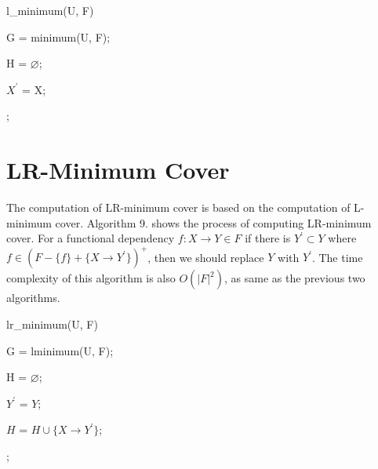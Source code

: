 \documentclass[11pt]{book}
\begin{document}
\begin{algorithm}
 
  \caption{l\_minimum(U, F)}
  
  \SetAlgoLined
  
  G = minimum(U, F);
  
  H = $\varnothing$;
  
   {
    $X^{'}$ = X;
     	
  }
  
  ;

\end{algorithm}

\section{LR-Minimum Cover}

The computation of LR-minimum cover is based on the computation of L-minimum cover. 
Algorithm 9. shows the process of computing LR-minimum cover. For a functional dependency $f: X \rightarrow Y \in F$ if there is $Y^{'} \subset Y$ where $f \in (F - \{f\} + \{ X \rightarrow Y^{'} \})^{+}$, then we should replace $Y$ with $Y^{'}$. The time complexity of this algorithm is also $O(|F|^2)$, as same as the previous two algorithms.

\begin{algorithm}

  \caption{lr\_minimum(U, F)}
  
  \SetAlgoLined
  
  G = lminimum(U, F);
  
  H = $\varnothing$;
  
   {
  
    $Y^{'}$ = $Y$;
    
  	
  	$H$ = $H \cup \{ X \rightarrow Y^{'} \}$;
  }
  
  ;

\end{algorithm}
\end{document}
